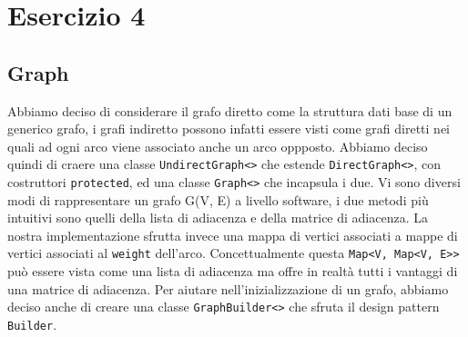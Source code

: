 \documentclass[letterpaper]{report}
\begin{document}
\chapter*{Esercizio 4}
\section{Graph}
Abbiamo deciso di considerare il grafo diretto come la struttura dati base di un 
generico grafo, i grafi indiretto possono infatti essere visti come grafi diretti 
nei quali ad ogni arco viene associato anche un arco oppposto. Abbiamo deciso quindi 
di craere una classe \verb|UndirectGraph<>| che estende \verb|DirectGraph<>|, con 
costruttori \verb|protected|, ed una classe \verb|Graph<>| che incapsula i due.
\newline
\newline
Vi sono diversi modi di rappresentare un grafo G(V, E) a livello software, i due metodi 
più intuitivi sono quelli della lista di adiacenza e della matrice di adiacenza.
La nostra implementazione sfrutta invece una mappa di vertici associati a mappe di 
vertici associati al \verb|weight| dell'arco. 
\newline
Concettualmente questa \verb|Map<V, Map<V, E>>| può essere vista come una lista di 
adiacenza ma offre in realtà tutti i vantaggi di una matrice di adiacenza.
\newline
\newline
Per aiutare nell'inizializzazione di un grafo, abbiamo deciso anche di creare una 
classe \verb|GraphBuilder<>| che sfruta il design pattern \verb|Builder|.
\end{document}
